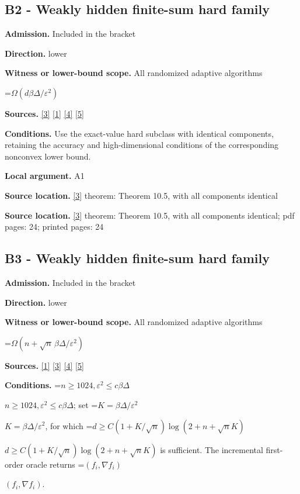\documentclass[10pt,a4paper]{article}
\newcommand{\AtlasMath}[1]{\par\begingroup\centering\setbox0=\hbox{$\displaystyle #1$}\ifdim\wd0>1.4\linewidth\typeout{ATLAS WIDE FORMULA: \the\wd0}\fi\ifdim\wd0>\linewidth\resizebox{\linewidth}{!}{\box0}\else\box0\fi\par\endgroup}
\newcommand{\AtlasInlineMath}[1]{\begingroup\setbox0=\hbox{$#1$}\ifdim\wd0>.4\linewidth\endgroup\AtlasMath{#1}\else\endgroup$#1$\fi}
\begin{document}
\subsection{B2 - Weakly hidden finite-sum hard family}
\textbf{Admission.} Included in the bracket

\textbf{Direction.} lower

\textbf{Witness or lower-bound scope.} All randomized adaptive algorithms

\AtlasMath{\Omega(d\beta \Delta/\varepsilon^2)}
\textbf{Sources.} \href{https://arxiv.org/html/2610.19652v1}{[3]} \href{https://arxiv.org/html/2609.00045v3}{[1]} \href{https://arxiv.org/pdf/2610.00245v2}{[4]} \href{https://arxiv.org/html/2610.17074v1}{[5]}

\textbf{Conditions.} Use the exact-value hard subclass with identical components, retaining the accuracy and high-dimensional conditions of the corresponding nonconvex lower bound.

\textbf{Local argument.} A1

\textbf{Source location.} \href{https://arxiv.org/html/2610.19652v1}{[3]} theorem: Theorem 10.5, with all components identical

\textbf{Source location.} \href{https://arxiv.org/html/2610.19652v1}{[3]} theorem: Theorem 10.5, with all components identical; pdf pages: 24; printed pages: 24

\subsection{B3 - Weakly hidden finite-sum hard family}
\textbf{Admission.} Included in the bracket

\textbf{Direction.} lower

\textbf{Witness or lower-bound scope.} All randomized adaptive algorithms

\AtlasMath{\Omega(n+\sqrt n\,\beta \Delta/\varepsilon^2)}
\textbf{Sources.} \href{https://arxiv.org/html/2609.00045v3}{[1]} \href{https://arxiv.org/html/2610.19652v1}{[3]} \href{https://arxiv.org/pdf/2610.00245v2}{[4]} \href{https://arxiv.org/html/2610.17074v1}{[5]}

\textbf{Conditions.} \AtlasInlineMath{n\ge1024,\varepsilon^2\le c\beta \Delta}; set \AtlasInlineMath{K=\beta \Delta/\varepsilon^2}, for which \AtlasInlineMath{d\ge C(1+K/\sqrt n)\log(2+n+\sqrt nK)} is sufficient. The incremental first-order oracle returns \AtlasInlineMath{(f_i,\nabla f_i)}.
\end{document}
